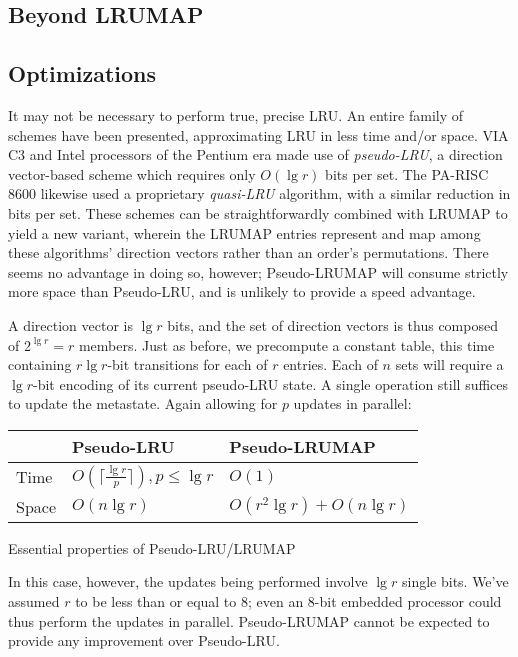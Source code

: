 \documentclass[letterpaper,10pt]{article}
\makeatletter
\newenvironment{tablehere}
{\def\@captype{table}}
{}
\makeatother
\begin{document}
\begin{multicols}{2}
\section{Beyond LRUMAP}
\subsection{Optimizations}
It may not be necessary to perform true, precise LRU. An entire family of
schemes have been presented, approximating LRU in less time and/or space.
VIA C3\textsuperscript{\textregistered} and Intel processors of the Pentium\textsuperscript{\textregistered} era\cite{shanley} made use of
\textit{pseudo-LRU}, a direction vector-based scheme which requires only
$O(\lg{r})$ bits per set\cite{handy}. The PA-RISC 8600\cite{hurd} likewise used
a proprietary \textit{quasi-LRU} algorithm, with a similar reduction in bits
per set. These schemes can be straightforwardly combined with LRUMAP to yield a
new variant, wherein the LRUMAP entries represent and map among these
algorithms' direction vectors rather than an order's permutations. There seems
no advantage in doing so, however; Pseudo-LRUMAP will consume strictly more space
than Pseudo-LRU, and is unlikely to provide a speed advantage.

A direction vector is $\lg{r}$ bits, and the set of direction vectors is thus
composed of $2^{\lg{r}}=r$ members. Just as before, we precompute a constant
table, this time containing $r \lg{r}$-bit transitions for each of $r$
entries. Each of $n$ sets will require a $\lg{r}$-bit encoding of its current
pseudo-LRU state. A single operation still suffices to update the metastate.
Again allowing for $p$ updates in parallel:
\begin{center}
\begin{tablehere}
	\begin{tabular}{|l|l|l|}
	\hline
	& Pseudo-LRU & Pseudo-LRUMAP \\
	\hline
	Time & $O(\lceil\frac{\lg{r}}{p}\rceil), {p}\le{\lg{r}}$ & $O(1)$ \\
	\hline
	Space & $O(n\lg{r})$ & $O(r^{2}\lg{r}) + O(n\lg{r})$ \\
	\hline
	\end{tabular}
	\caption{Essential properties of Pseudo-LRU/LRUMAP}
	\label{tab:pseudolru}
\end{tablehere}
\end{center}
In this case, however, the updates being performed involve $\lg{r}$ single bits.
We've assumed $r$ to be less than or equal to 8; even an 8-bit embedded processor
could thus perform the updates in parallel. Pseudo-LRUMAP cannot be expected to
provide any improvement over Pseudo-LRU.

\end{multicols}
\end{document}
